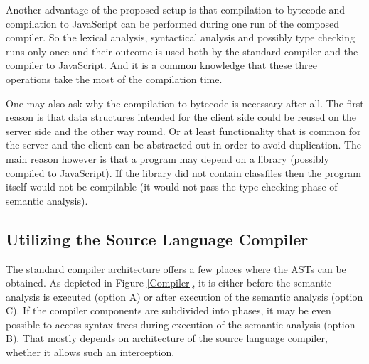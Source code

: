 \documentclass[12pt,a4paper]{report}
\begin{document}
Another advantage of the proposed setup is that compilation to bytecode and compilation to JavaScript can be performed during one run of the composed compiler. So the lexical analysis, syntactical analysis and possibly type checking runs only once and their outcome is used both by the standard compiler and the compiler to JavaScript. And it is a common knowledge that these three operations take the most of the compilation time. 

One may also ask why the compilation to bytecode is necessary after all. The first reason is that data structures intended for the client side could be reused on the server side and the other way round. Or at least functionality that is common for the server and the client can be abstracted out in order to avoid duplication. The main reason however is that a program may depend on a library (possibly compiled to JavaScript). If the library did not contain classfiles then the program itself would not be compilable (it would not pass the type checking phase of semantic analysis).

\subsection{Utilizing the Source Language Compiler}

The standard compiler architecture offers a few places where the ASTs can be obtained. As depicted in Figure \ref{Compiler}, it is either before the semantic analysis is executed (option A) or after execution of the semantic analysis (option C). If the compiler components are subdivided into phases, it may be even possible to access syntax trees during execution of the semantic analysis (option B). That mostly depends on architecture of the source language compiler, whether it allows such an interception.
\end{document}
